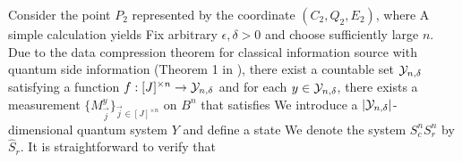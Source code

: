 \documentclass[journal]{IEEEtran}
\begin{document}
\begin{lmm}
\begin{lmm}
Consider the point $P_2$ represented by the coordinate $(C_2,Q_2,E_2)$, where
A simple calculation yields
Fix arbitrary $\epsilon,\delta>0$ and choose sufficiently large $n$. 
Due to the data compression theorem for classical information source with quantum side information (Theorem 1 in \cite{devetak2003classical}),
 there exist a countable set ${\mathcal Y}_{n,\delta}$ satisfying
a function $f:[J]^{\times n}\rightarrow {\mathcal Y}_{n,\delta}$ and 
 for each $y\in{\mathcal Y}_{n,\delta}$, there exists a measurement $\{M_{\vec{j}}^y\}_{\vec{j}\in[J]^{\times n}}$ on $B^n$  that satisfies
We introduce a $|{\mathcal Y}_{n,\delta}|$-dimensional quantum system $Y$ and define a state
We denote the system $S_c^nS_r^n$ by $\hat{S}_r$.
It is straightforward to verify that




\end{lmm}
\end{lmm}
\end{document}
